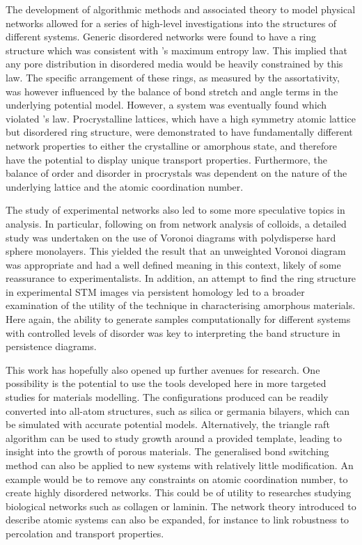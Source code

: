 The development of algorithmic methods and associated theory to model physical networks allowed for a series of high\--level investigations into the structures of different systems.
Generic disordered networks were found to have a ring structure which was consistent with \lm's maximum entropy law.
This implied that any pore distribution in disordered media would be heavily constrained by this law.
The specific arrangement of these rings, as measured by the assortativity, was however influenced by the balance of bond stretch and angle terms in the underlying potential model.
However, a system was eventually found which violated \lm's law.
Procrystalline lattices, which have a high symmetry atomic lattice but disordered ring structure, were demonstrated to have fundamentally different network properties to either the crystalline or amorphous state, and therefore have the potential to display unique transport properties.
Furthermore, the balance of order and disorder in procrystals was dependent on the nature of the underlying lattice and the atomic coordination number.

The study of experimental \td{} networks also led to some more speculative topics in analysis.
In particular, following on from network analysis of colloids, a detailed study was undertaken on the use of Voronoi diagrams with polydisperse hard sphere monolayers.
This yielded the result that an unweighted Voronoi diagram was appropriate and had a well defined meaning in this context, likely of some reassurance to experimentalists.
In addition, an attempt to find the ring structure in experimental STM images via persistent homology led to a broader examination of the utility of the technique in characterising amorphous materials.
Here again, the ability to generate samples computationally for different systems with controlled levels of disorder was key to interpreting the band structure in persistence diagrams.

This work has hopefully also opened up further avenues for research.
One possibility is the potential to use the tools developed here in more targeted studies for materials modelling.
The configurations produced can be readily converted into all\--atom structures, such as silica or germania bilayers, which can be simulated with accurate potential models.
Alternatively, the triangle raft algorithm can be used to study growth around a provided template, leading to insight into the growth of porous materials.
The generalised bond switching method can also be applied to new systems with relatively little modification.
An example would be to remove any constraints on atomic coordination number, to create highly disordered networks.
This could be of utility to researches studying biological networks such as collagen or laminin. 
The network theory introduced to describe atomic systems can also be expanded, for instance to link robustness to percolation and transport properties.

